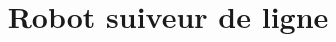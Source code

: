 \documentclass[12pt, a4paper]{article}
\begin{document}
\title{Robot suiveur de ligne}
\end{document}
